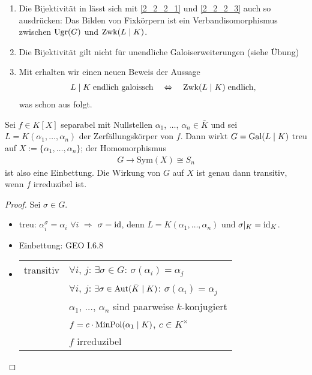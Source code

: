 \begin{remark}
	\begin{enumerate}[label={(\alph*)},topsep=0pt]
		\item Die Bijektivität in  lässt sich mit \ref{2_2_2_1} und \ref{2_2_2_3} auch so ausdrücken: Das Bilden von Fixkörpern ist ein Verbandisomorphismus zwischen $\operatorname{Ugr}(G)$ und $\operatorname{Zwk}(L\mid K)$.
		\item Die Bijektivität gilt nicht für unendliche Galoiserweiterungen (siehe Übung)
		\item Mit  erhalten wir einen neuen Beweis der Aussage \begin{align*}
			L\mid K\;\text{endlich galoissch}\quad\Leftrightarrow\quad \operatorname{Zwk}(L\mid K)\;\text{endlich},
		\end{align*}
		was schon aus  folgt.
	\end{enumerate}
\end{remark}

\begin{proposition}
	Sei $f\in K[X]$ separabel mit Nullstellen $\alpha_1$, $\dots$, $\alpha_n\in\bar K$ und sei $L=K(\alpha_1,\dots,\alpha_n)$ der \linebreak Zer\-fäl\-lungs\-kör\-per von $f$. Dann wirkt $G=\operatorname{Gal}(L\mid K)$  treu auf $X:= \lbrace\alpha_1,\dots,\alpha_n\rbrace$; der Homomorphismus \begin{align*}
		G\rightarrow \mathrm{Sym}(X) \cong S_n
	\end{align*}
	ist also eine Einbettung. Die Wirkung von $G$ auf $X$ ist genau dann transitiv, wenn $f$ irreduzibel ist.
\end{proposition}

\begin{proof}
	Sei $\sigma\in G$. \begin{itemize}[topsep=-6pt]
		\item treu: $\alpha_i^\sigma = \alpha_i$ $\forall i$ $\Rightarrow$ $\sigma=\operatorname{id}$, denn $L=K(\alpha_1,\dots,\alpha_n)$ und $\sigma|_K = \operatorname{id}_K$.
		\item Einbettung: GEO I.6.8
		\item \begin{tabular}[t]{@{}r@{$\quad\Leftrightarrow\quad$}l}
			transitiv & $\forall i$, $j$: $\exists \sigma\in G$: $\sigma(\alpha_i) = \alpha_j$ \\
			& $\forall i$, $j$: $\exists \sigma\in \operatorname{Aut}(\bar K\mid K)$: $\sigma(\alpha_i)= \alpha_j$ \\
			& $\alpha_1$, $\dots$, $\alpha_n$ sind paarweise $k$-konjugiert \\
			& $f = c\cdot \operatorname{MinPol}(\alpha_1\mid K)$, $c\in K^\times$ \\
			& $f$ irreduzibel
		\end{tabular}
	\end{itemize}
\end{proof}

